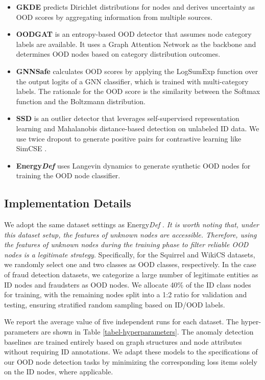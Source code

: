 \begin{itemize}[nosep, topsep=0pt, leftmargin=*]
    \item \textbf{GKDE} \citep{zhao2020uncertainty} predicts Dirichlet distributions for nodes and derives uncertainty as OOD scores by aggregating information from multiple sources.
    \item \textbf{OODGAT} \citep{song2022learning} is an entropy-based OOD detector that assumes node category labels are available. It uses a Graph Attention Network as the backbone and determines OOD nodes based on category distribution outcomes.
    \item \textbf{GNNSafe }\citep{wu2023energy} calculates OOD scores by applying the LogSumExp function over the output logits of a GNN classifier, which is trained with multi-category labels. The rationale for the OOD score is the similarity between the Softmax function and the Boltzmann distribution.
    \item \textbf{SSD} \citep{sehwag2021ssd} is an outlier detector that leverages self-supervised representation learning and Mahalanobis distance-based detection on unlabeled ID data. We use twice dropout to generate positive pairs for contrastive learning like SimCSE \citep{gao2021simcse}.
    \item \textbf{Energy\textit{Def}} \cite{gong2024energy} uses Langevin dynamics to generate synthetic OOD nodes for training the OOD node classifier.
\end{itemize}

\subsection{Implementation Details} \label{subsec-apdix-Implementation} 
We adopt the same dataset settings as Energy\textit{Def} \citep{gong2024energy}. \textit{It is worth noting that, under this dataset setup, the features of unknown nodes are accessible. Therefore, using the features of unknown nodes during the training phase to filter reliable OOD nodes is a legitimate strategy}. Specifically, for the Squirrel and WikiCS datasets, we randomly select one and two classes as OOD classes, respectively. In the case of fraud detection datasets, we categorize a large number of legitimate entities as ID nodes and fraudsters as OOD nodes. We allocate 40\% of the ID class nodes for training, with the remaining nodes split into a 1:2 ratio for validation and testing, ensuring stratified random sampling based on ID/OOD labels.

We report the average value of five independent runs for each dataset. The hyper-parameters are shown in Table \ref{tabel-hyperparameters}. 
The anomaly detection baselines are trained entirely based on graph structures and node attributes without requiring ID annotations. 
We adapt these models to the specifications of our OOD node detection tasks by minimizing the corresponding loss items solely on the ID nodes, where applicable. 

